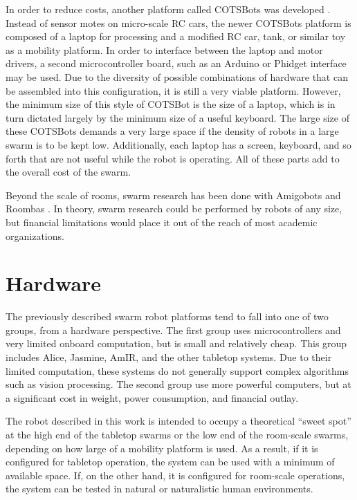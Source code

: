 \documentclass[]{article}
\begin{document}
In order to reduce costs, another platform called COTSBots was developed \cite{soule2011cotsbots}.  
Instead of sensor motes on micro-scale RC cars, the newer COTSBots platform is composed of a laptop for processing and a modified RC car, tank, or similar toy as a mobility platform.
In order to interface between the laptop and motor drivers, a second microcontroller board, such as an Arduino or Phidget interface may be used. 
Due to the diversity of possible combinations of hardware that can be assembled into this configuration, it is still a very viable platform. 
However, the minimum size of this style of COTSBot is the size of a laptop, which is in turn dictated largely by the minimum size of a useful keyboard. 
The large size of these COTSBots demands a very large space if the density of robots in a large swarm is to be kept low. 
Additionally, each laptop has a screen, keyboard, and so forth that are not useful while the robot is operating. 
All of these parts add to the overall cost of the swarm. 

Beyond the scale of rooms, swarm research has been done with Amigobots and Roombas \cite{guo2007bio, tammet2008rfid}.
In theory, swarm research could be performed by robots of any size, but financial limitations would place it out of the reach of most academic organizations. 

\section{Hardware}

The previously described swarm robot platforms tend to fall into one of two groups, from a hardware perspective. 
The first group uses microcontrollers and very limited onboard computation, but is small and relatively cheap.
This group includes Alice, Jasmine, AmIR, and the other tabletop systems. 
Due to their limited computation, these systems do not generally support complex algorithms such as vision processing. 
The second group use more powerful computers, but at a significant cost in weight, power consumption, and financial outlay.

The robot described in this work is intended to occupy a theoretical ``sweet spot'' at the high end of the tabletop swarms or the low end of the room-scale swarms, depending on how large of a mobility platform is used. 
As a result, if it is configured for tabletop operation, the system can be used with a minimum of available space. 
If, on the other hand, it is configured for room-scale operations, the system can be tested in natural or naturalistic human environments. 
\end{document}
